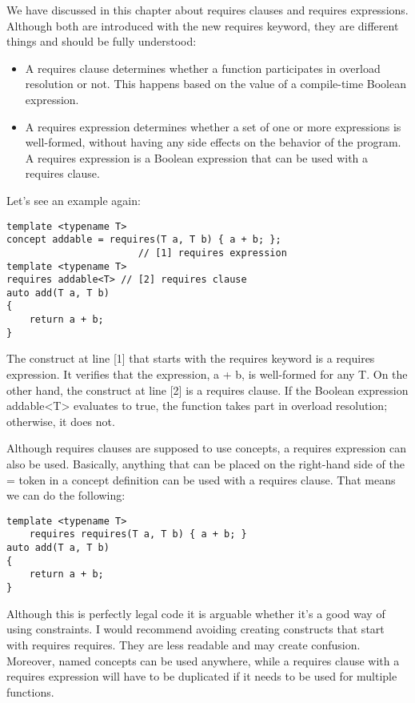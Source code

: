 We have discussed in this chapter about requires clauses and requires expressions. Although both are introduced with the new requires keyword, they are different things and should be fully understood:

\begin{itemize}
\item
A requires clause determines whether a function participates in overload resolution or not. This happens based on the value of a compile-time Boolean expression.

\item
A requires expression determines whether a set of one or more expressions is well-formed, without having any side effects on the behavior of the program. A requires expression is a Boolean expression that can be used with a requires clause.
\end{itemize}

Let’s see an example again:

\begin{lstlisting}[style=styleCXX]
template <typename T>
concept addable = requires(T a, T b) { a + b; };
                       // [1] requires expression
template <typename T>
requires addable<T> // [2] requires clause
auto add(T a, T b)
{
	return a + b;
}
\end{lstlisting}

The construct at line [1] that starts with the requires keyword is a requires expression. It verifies that the expression, a + b, is well-formed for any T. On the other hand, the construct at line [2] is a requires clause. If the Boolean expression addable<T> evaluates to true, the function takes part in overload resolution; otherwise, it does not.

Although requires clauses are supposed to use concepts, a requires expression can also be used. Basically, anything that can be placed on the right-hand side of the = token in a concept definition can be used with a requires clause. That means we can do the following:

\begin{lstlisting}[style=styleCXX]
template <typename T>
	requires requires(T a, T b) { a + b; }
auto add(T a, T b)
{
	return a + b;
}
\end{lstlisting}

Although this is perfectly legal code it is arguable whether it’s a good way of using constraints. I would recommend avoiding creating constructs that start with requires requires. They are less readable and may create confusion. Moreover, named concepts can be used anywhere, while a requires clause with a requires expression will have to be duplicated if it needs to be used for multiple functions.

